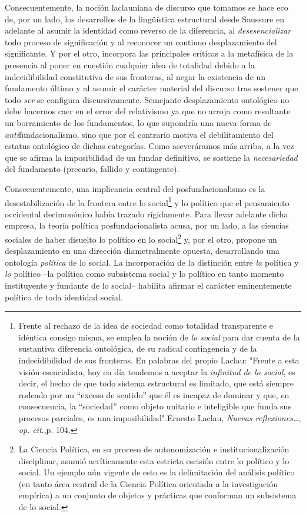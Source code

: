 \documentclass{book}
\begin{document}
Consecuentemente, la noción laclauniana de discurso que tomamos se hace
eco de, por un lado, los desarrollos de la lingüística estructural desde
Saussure en adelante al asumir la identidad como reverso de la
diferencia, al \emph{desesencializar} todo proceso de significación y al
reconocer un continuo desplazamiento del significante. Y por el otro,
incorpora las principales críticas a la metafísica de la presencia al
poner en cuestión cualquier idea de totalidad debido a la
indecidibilidad constitutiva de sus fronteras, al negar la existencia de
un fundamento último y al asumir el carácter material del discurso tras
sostener que todo \emph{ser} se configura discursivamente. Semejante
desplazamiento ontológico no debe hacernos caer en el error del
relativismo ya que no arroja como resultante un borramiento de los
fundamentos, lo que supondría una nueva forma de
\emph{anti}fundacionalismo, sino que por el contrario motiva el
debilitamiento del estatus ontológico de dichas categorías. Como
aseveráramos más arriba, a la vez que se afirma la imposibilidad de un
fundar definitivo, se sostiene la \emph{necesariedad} del fundamento
(precario, fallido y contingente).

Consecuentemente, una implicancia central del posfundacionalismo es la
desestabilización de la frontera entre lo social\footnote{Frente al
  rechazo de la idea de sociedad como totalidad transparente e idéntica
  consigo misma, se emplea la noción de \emph{lo social} para dar cuenta
  de la sustantiva diferencia ontológica, de su radical contingencia y
  de la indecidibilidad de sus fronteras. En palabras del propio Laclau:
  "Frente a esta visión esencialista, hoy en día tendemos a aceptar la
  \emph{infinitud de lo social}, es decir, el hecho de que todo sistema
  estructural es limitado, que está siempre rodeado por un ``exceso de
  sentido'' que él es incapaz de dominar y que, en consecuencia, la
  ``sociedad'' como objeto unitario e inteligible que funda sus procesos
  parciales, es una imposibilidad".Ernesto Laclau, \emph{Nuevas
  reflexiones\ldots{}}, \emph{op. cit}.,p. 104.} y lo político que el
pensamiento occidental decimonónico había trazado rígidamente. Para
llevar adelante dicha empresa, la teoría política posfundacionalista
acusa, por un lado, a las ciencias sociales de haber disuelto lo
político en lo social\footnote{La Ciencia Política, en su proceso de
  autonomización e institucionalización disciplinar, asumió
  acríticamente esta estricta escisión entre lo político y lo social. Un
  ejemplo aún vigente de esto es la delimitación del análisis político
  (en tanto área central de la Ciencia Política orientada a la
  investigación empírica) a un conjunto de objetos y prácticas que
  conforman un subsistema de lo social.} y, por el otro, propone un
desplazamiento en una dirección diametralmente opuesta, desarrollando
una ontología \emph{política} de lo social. La incorporación de la
distinción entre \emph{la} política y \emph{lo} político --la política
como subsistema social y lo político en tanto momento instituyente y
fundante de lo social-- habilita afirmar el carácter eminentemente
político de toda identidad social.
\end{document}
